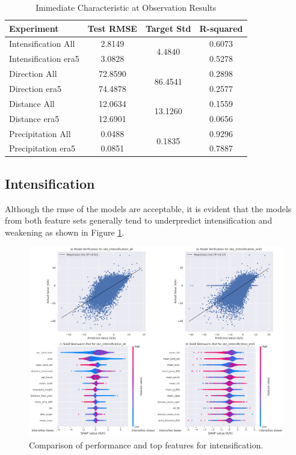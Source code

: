 \begin{table}[h!]
\centering
\caption{Immediate Characteristic at Observation Results}
\label{tab:obs_experiment_results}
\begin{tabular}{lccc}
\hline
\textbf{Experiment} & \textbf{Test RMSE} & \textbf{Target Std} & \textbf{R-squared} \\
\hline
Intensification All     & 2.8149  & \multirow{2}{*}{4.4840}  & 0.6073 \\
Intensification \acrshort{era5}    & 3.0828  & & 0.5278 \\
Direction All     & 72.8590 & \multirow{2}{*}{86.4541} & 0.2898 \\
Direction \acrshort{era5}     & 74.4878 & & 0.2577 \\
Distance All      & 12.0634 & \multirow{2}{*}{13.1260} & 0.1559 \\
Distance \acrshort{era5}     & 12.6901 & & 0.0656 \\
Precipitation All       & 0.0488  & \multirow{2}{*}{0.1835}  & 0.9296 \\
Precipitation \acrshort{era5}      & 0.0851  & & 0.7887 \\
\hline
\end{tabular}
\end{table}

\clearpage
\subsection{Intensification}
\label{sec:results-intensification}

Although the \acrshort{rmse} of the models are acceptable, it is evident that the models from both feature sets generally tend to underpredict intensification and weakening as shown in Figure \ref{fig:obs_intensification_summary}.

\begin{figure}[ht]
    \centering
    \includegraphics[width=\textwidth]{../figures/generated/experiments/obs_intensification/obs_intensification_summary.png}
    \caption{Comparison of performance and top features for intensification.}
    \label{fig:obs_intensification_summary}
\end{figure}

